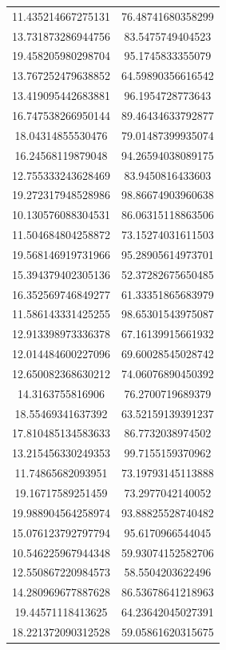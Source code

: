 \begin{table}
\begin{tabular}{cc}
11.435214667275131 & 76.48741680358299 \\
13.731873286944756 & 83.5475749404523 \\
19.458205980298704 & 95.1745833355079 \\
13.767252479638852 & 64.59890356616542 \\
13.419095442683881 & 96.1954728773643 \\
16.747538266950144 & 89.46434633792877 \\
18.04314855530476 & 79.01487399935074 \\
16.24568119879048 & 94.26594038089175 \\
12.755333243628469 & 83.9450816433603 \\
19.272317948528986 & 98.86674903960638 \\
10.130576088304531 & 86.06315118863506 \\
11.504684804258872 & 73.15274031611503 \\
19.568146919731966 & 95.28905614973701 \\
15.394379402305136 & 52.37282675650485 \\
16.352569746849277 & 61.33351865683979 \\
11.586143331425255 & 98.65301543975087 \\
12.913398973336378 & 67.16139915661932 \\
12.014484600227096 & 69.60028545028742 \\
12.650082368630212 & 74.06076890450392 \\
14.3163755816906 & 76.2700719689379 \\
18.55469341637392 & 63.52159139391237 \\
17.810485134583633 & 86.7732038974502 \\
13.215456330249353 & 99.7155159370962 \\
11.74865682093951 & 73.19793145113888 \\
19.16717589251459 & 73.2977042140052 \\
19.988904564258974 & 93.88825528740482 \\
15.076123792797794 & 95.6170966544045 \\
10.546225967944348 & 59.93074152582706 \\
12.550867220984573 & 58.5504203622496 \\
14.280969677887628 & 86.53678641218963 \\
19.44571118413625 & 64.23642045027391 \\
18.221372090312528 & 59.05861620315675 \\

\end{tabular}
\end{table}
